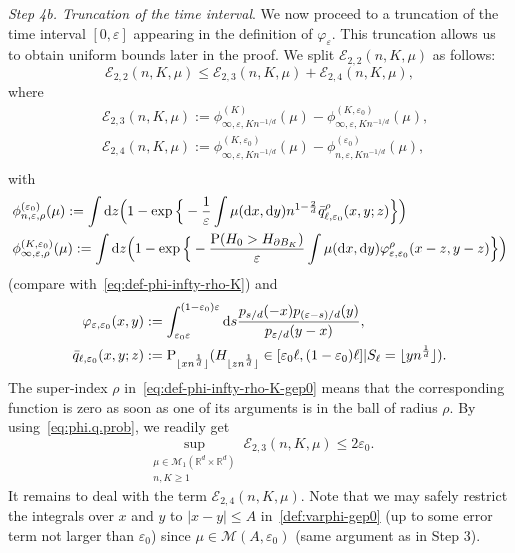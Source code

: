 \documentclass[a4paper,11pt]{amsart}
\numberwithin{equation}{section}
\newcommand{\bbR}{{\ensuremath{\mathbb R}} }
\newcommand{\cE}{{\ensuremath{\mathcal E}} }
\newcommand{\cM}{{\ensuremath{\mathcal M}} }
\newcommand{\gep}{\varepsilon}
\newcommand{\dd}{\text{\rm d}}             %
\newcommand{\suptwo}[2]{\sup_{\substack{#1 \\ #2}}} %
\newcommand\bP{\ensuremath{\mathrm{P}}}
\newcommand{\8}{\infty}
\newcommand{\beq}{\begin{equation}}
\newcommand{\eeq}{\end{equation}}
\newcommand{\ba}{\begin{aligned}}
\newcommand{\ea}{\end{aligned}}
\begin{document}
{\it Step 4b. Truncation of the time interval}. We now proceed to a truncation of the time interval $[0,\gep]$ appearing in the definition of $\varphi_\gep$. This truncation allows us to obtain uniform bounds later in the proof. We split $\cE_{2,2}(n,K,\mu)$ as follows:
\beq
\cE_{2,2}(n,K,\mu) \le \cE_{2,3}(n,K,\mu) + \cE_{2,4}(n,K,\mu),
\eeq
where
\beq
\ba
&\cE_{2,3}(n,K,\mu) := \phi^{(K)}_{\infty,\gep, Kn^{-1/d}}(\mu) -\phi^{(K,\gep_0)}_{\infty,\gep, Kn^{-1/d}}(\mu),\\
&\cE_{2,4}(n,K,\mu) := \phi^{(K,\gep_0)}_{\infty,\gep, Kn^{-1/d}}(\mu) - \phi^{(\gep_0)}_{n,\gep, Kn^{-1/d}}(\mu),\\
\ea
\eeq
with
\beq
\ba
\label{eq:def-phi-infty-rho-K-gep0}
&\phi^{(\gep_0)}_{n,\gep, \rho}(\mu) := \int \dd z\Big(1 - \exp\Big\{-\frac1\gep \int \mu(\dd x, \dd y) n^{1-\frac2d} \bar q^\rho_{\ell,\gep_0}(x,y;z)\Big\}\Big)\\
&\phi^{(K,\gep_0)}_{\infty,\gep,\rho}(\mu)
:=\int  \dd z
\Big(1 - \exp\Big\{-\frac{\bP(H_0> H_{\partial B_K})}{\gep} \int \mu(\dd x, \dd y) \varphi_{\gep,\gep_0}^\rho(x-z,y-z)\Big\}\Big)
\ea
\eeq
(compare with~\eqref{eq:def-phi-infty-rho-K}) and
\beq\label{def:varphi-gep0}
\ba
\varphi_{\gep,\gep_0}(x,y) &:= \int_{\gep_0\gep}^{(1-\gep_0)\gep} \dd s \frac{p_{s/d}(-x)p_{(\gep-s)/d}(y)}{p_{\gep/d}(y-x)},\\
\bar q_{\ell,\gep_0}(x,y;z) &:= \bP_{\lfloor xn^{\frac1d}\rfloor}(H_{\lfloor zn^{\frac1d}\rfloor} \in [\gep_0\ell,(1-\gep_0)\ell] | S_\ell = \lfloor yn^{\frac1d}\rfloor).
\ea
\eeq
The super-index $\rho$ in~\eqref{eq:def-phi-infty-rho-K-gep0} means that the corresponding function is zero as soon as one of its arguments is in the ball of radius $\rho$.
By using~\eqref{eq:phi.q.prob}, we readily get
\beq
\suptwo{\mu\in\cM_1(\bbR^d\times\bbR^d)}{n,K\ge 1} \cE_{2,3}(n,K,\mu) \le 2\gep_0.
\eeq
It remains to deal with the term $\cE_{2,4}(n,K,\mu)$. Note that we may safely restrict the integrals over $x$ and $y$ to $|x-y|\le A$ in~\eqref{def:varphi-gep0} (up to some error term not larger than $\gep_0$) since $\mu\in\cM(A,\gep_0)$ (same argument as in Step 3).\\
\end{document}
